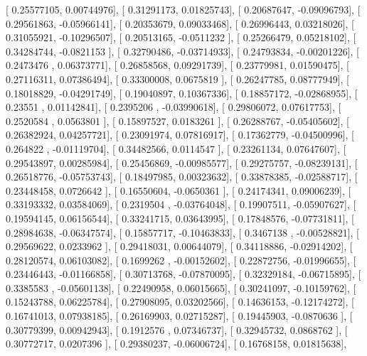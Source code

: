 \documentclass{article}
\begin{document}
       [ 0.25577105,  0.00744976],
       [ 0.31291173,  0.01825743],
       [ 0.20687647, -0.09096793],
       [ 0.29561863, -0.05966141],
       [ 0.20353679,  0.09033468],
       [ 0.26996443,  0.03218026],
       [ 0.31055921, -0.10296507],
       [ 0.20513165, -0.0511232 ],
       [ 0.25266479,  0.05218102],
       [ 0.34284744, -0.0821153 ],
       [ 0.32790486, -0.03714933],
       [ 0.24793834, -0.00201226],
       [ 0.2473476 ,  0.06373771],
       [ 0.26858568,  0.09291739],
       [ 0.23779981,  0.01590475],
       [ 0.27116311,  0.07386494],
       [ 0.33300008,  0.0675819 ],
       [ 0.26247785,  0.08777949],
       [ 0.18018829, -0.04291749],
       [ 0.19040897,  0.10367336],
       [ 0.18857172, -0.02868955],
       [ 0.23551   ,  0.01142841],
       [ 0.2395206 , -0.03990618],
       [ 0.29806072,  0.07617753],
       [ 0.2520584 ,  0.0563801 ],
       [ 0.15897527,  0.0183261 ],
       [ 0.26288767, -0.05405602],
       [ 0.26382924,  0.04257721],
       [ 0.23091974,  0.07816917],
       [ 0.17362779, -0.04500996],
       [ 0.264822  , -0.01119704],
       [ 0.34482566,  0.0114547 ],
       [ 0.23261134,  0.07647607],
       [ 0.29543897,  0.00285984],
       [ 0.25456869, -0.00985577],
       [ 0.29275757, -0.08239131],
       [ 0.26518776, -0.05753743],
       [ 0.18497985,  0.00323632],
       [ 0.33878385, -0.02588717],
       [ 0.23448458,  0.0726642 ],
       [ 0.16550604, -0.0650361 ],
       [ 0.24174341,  0.09006239],
       [ 0.33193332,  0.03584069],
       [ 0.2319504 , -0.03764048],
       [ 0.19907511, -0.05907627],
       [ 0.19594145,  0.06156544],
       [ 0.33241715,  0.03643995],
       [ 0.17848576, -0.07731811],
       [ 0.28984638, -0.06347574],
       [ 0.15857717, -0.10463833],
       [ 0.3467138 , -0.00528821],
       [ 0.29569622,  0.0233962 ],
       [ 0.29418031,  0.00644079],
       [ 0.34118886, -0.02914202],
       [ 0.28120574,  0.06103082],
       [ 0.1699262 , -0.00152602],
       [ 0.22872756, -0.01996655],
       [ 0.23446443, -0.01166858],
       [ 0.30713768, -0.07870095],
       [ 0.32329184, -0.06715895],
       [ 0.3385583 , -0.05601138],
       [ 0.22490958,  0.06015665],
       [ 0.30241097, -0.10159762],
       [ 0.15243788,  0.06225784],
       [ 0.27908095,  0.03202566],
       [ 0.14636153, -0.12174272],
       [ 0.16741013,  0.07938185],
       [ 0.26169903,  0.02715287],
       [ 0.19445903, -0.0870636 ],
       [ 0.30779399,  0.00942943],
       [ 0.1912576 ,  0.07346737],
       [ 0.32945732,  0.0868762 ],
       [ 0.30772717,  0.0207396 ],
       [ 0.29380237, -0.06006724],
       [ 0.16768158,  0.01815638],
\end{document}
